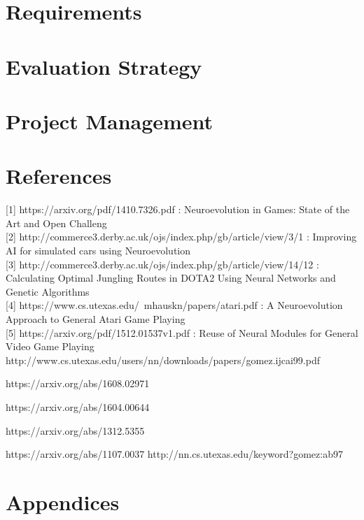 \documentclass[11pt,a4paper]{article}
\begin{document}
\newpage
\section{Requirements}

\section{Evaluation Strategy}

\section{Project Management}

\section{References}

[1] https://arxiv.org/pdf/1410.7326.pdf : Neuroevolution in Games: State of the Art and Open Challeng\\

[2] http://commerce3.derby.ac.uk/ojs/index.php/gb/article/view/3/1 : Improving AI for simulated cars using Neuroevolution\\

[3] http://commerce3.derby.ac.uk/ojs/index.php/gb/article/view/14/12 : Calculating Optimal Jungling Routes in DOTA2 Using Neural Networks and Genetic Algorithms\\

[4] https://www.cs.utexas.edu/~mhauskn/papers/atari.pdf : A Neuroevolution Approach to General Atari Game Playing\\

[5] https://arxiv.org/pdf/1512.01537v1.pdf : Reuse of Neural Modules for General Video Game Playing\\

http://www.cs.utexas.edu/users/nn/downloads/papers/gomez.ijcai99.pdf

https://arxiv.org/abs/1608.02971

https://arxiv.org/abs/1604.00644

https://arxiv.org/abs/1312.5355

https://arxiv.org/abs/1107.0037
http://nn.cs.utexas.edu/keyword?gomez:ab97
\section{Appendices}
\end{document}
